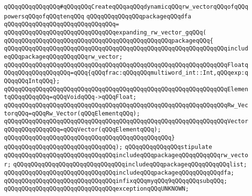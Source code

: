 \newline
\verb|qQQqqQQqqQQqqQQq#qQQqqQQqCreateqQQqaqQQqdynamicqQQqrw_vectorqQQqofqQQqpowersqQQqofqQQqtenqQQq|\newline
\newline
\verb|qQQqqQQqqQQqqQQqpackageqQQqdfa|\newline
\verb|qQQqqQQqqQQqqQQqqQQqqQQqqQQqqQQq=|\newline
\verb|qQQqqQQqqQQqqQQqqQQqqQQqqQQqqQQqexpanding_rw_vector_gqQQq(|\newline
\newline
\verb|qQQqqQQqqQQqqQQqqQQqqQQqqQQqqQQqqQQqqQQqqQQqqQQqpackageqQQq{|\newline
\verb|qQQqqQQqqQQqqQQqqQQqqQQqqQQqqQQqqQQqqQQqqQQqqQQqqQQqqQQqqQQqqQQqincludeqQQqpackageqQQqqQQqqQQqrw_vector;|\newline
\newline
\verb|qQQqqQQqqQQqqQQqqQQqqQQqqQQqqQQqqQQqqQQqqQQqqQQqqQQqqQQqqQQqqQQqFloatqQQqqQQqqQQqqQQqqQQq=qQQq{qQQqfrac:qQQqqQQqmultiword_int::Int,qQQqexp:qQQqqQQqIntqQQq};|\newline
\verb|qQQqqQQqqQQqqQQqqQQqqQQqqQQqqQQqqQQqqQQqqQQqqQQqqQQqqQQqqQQqqQQqElementqQQqqQQqqQQq=qQQqVoidqQQq->qQQqFloat;|\newline
\verb|qQQqqQQqqQQqqQQqqQQqqQQqqQQqqQQqqQQqqQQqqQQqqQQqqQQqqQQqqQQqqQQqRw_VectorqQQq=qQQqRw_Vector(qQQqElementqQQq);|\newline
\verb|qQQqqQQqqQQqqQQqqQQqqQQqqQQqqQQqqQQqqQQqqQQqqQQqqQQqqQQqqQQqqQQqVectorqQQqqQQqqQQqqQQq=qQQqVector(qQQqElementqQQq);|\newline
\verb|qQQqqQQqqQQqqQQqqQQqqQQqqQQqqQQqqQQqqQQqqQQqqQQq}|\newline
\verb|qQQqqQQqqQQqqQQqqQQqqQQqqQQqqQQq);|\newline
\newline
\verb|qQQqqQQqqQQqqQQqstipulate|\newline
\newline
\verb|qQQqqQQqqQQqqQQqqQQqqQQqqQQqqQQqincludeqQQqpackageqQQqqQQqqQQqrw_vector;|\newline
\verb|qQQqqQQqqQQqqQQqqQQqqQQqqQQqqQQqincludeqQQqpackageqQQqqQQqqQQqlist;|\newline
\verb|qQQqqQQqqQQqqQQqqQQqqQQqqQQqqQQqincludeqQQqpackageqQQqqQQqqQQqdfa;|\newline
\newline
\verb|qQQqqQQqqQQqqQQqqQQqqQQqqQQqqQQqinfixqQQqmyqQQq9qQQqqQQqsubqQQq;|\newline
\newline
\verb|qQQqqQQqqQQqqQQqqQQqqQQqqQQqqQQqexceptionqQQqUNKNOWN;|\newline
